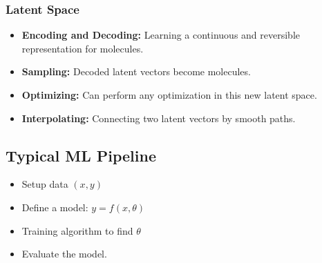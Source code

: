 \subsubsection{Latent Space}
\begin{notes}
    \begin{itemize}
        \item \textbf{Encoding and Decoding:} Learning a continuous and reversible representation for molecules. 
        \item \textbf{Sampling:} Decoded latent vectors become molecules.
        \item \textbf{Optimizing:} Can perform any optimization in this new latent space.
        \item \textbf{Interpolating:} Connecting two latent vectors by smooth paths.
    \end{itemize}
\end{notes}

\subsection{Typical ML Pipeline}
\begin{notes}
    \begin{itemize}
        \item Setup data $(x,y)$
        \item Define a model: $y = f(x,\theta)$
        \item Training algorithm to find $\theta$
        \item Evaluate the model.
    \end{itemize}
\end{notes}

